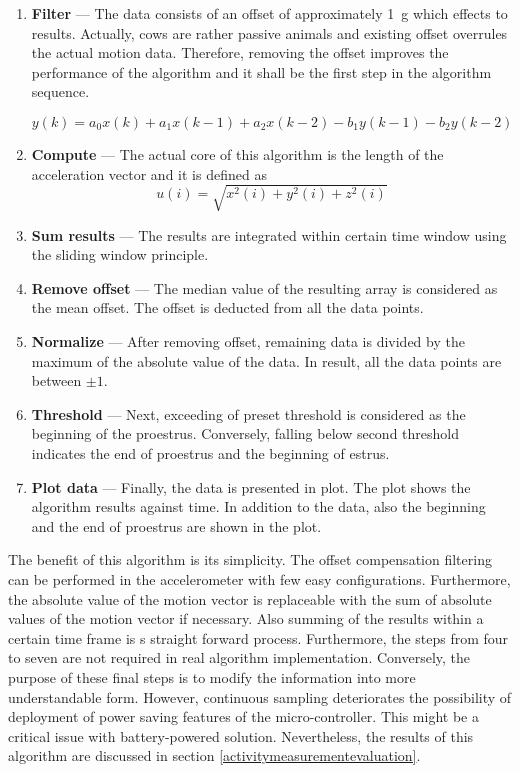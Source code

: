\documentclass[english,12pt,a4paper,pdftex,elec,utf8]{aaltothesis}
\begin{document}
\begin{enumerate}
\item \textbf{Filter} --- The data consists of an offset of approximately \SI{1}{\gram} which effects to results. Actually, cows are rather passive animals and existing offset overrules the actual motion data. Therefore, removing the offset improves the performance of the algorithm and it shall be the first step in the algorithm sequence.

\begin{equation}
y(k) = a_0 x(k) + a_1 x(k-1) + a_2 x(k-2) - b_1 y(k-1) - b_2 y(k-2)
\end{equation}

\item \textbf{Compute} --- The actual core of this algorithm is the length of the acceleration vector and it is defined as \begin{equation}
u(i) = \sqrt{x^2(i) + y^2(i) + z^2(i)} 
\end{equation}

\item \textbf{Sum results} --- The results are integrated within certain time window using the sliding window principle.

\item \textbf{Remove offset} --- The median value of the resulting array is considered as the mean offset. The offset is deducted from all the data points.

\item \textbf{Normalize} --- After removing offset, remaining data is divided by the maximum of the absolute value of the data. In result, all the data points are between $\pm 1$.

\item \textbf{Threshold} --- Next, exceeding of preset threshold is considered as the beginning of the proestrus. Conversely, falling below second threshold indicates the end of proestrus and the beginning of estrus.

\item \textbf{Plot data} --- Finally, the data is presented in plot. The plot shows the algorithm results against time. In addition to the data, also the beginning and the end of proestrus are shown in the plot.

\end{enumerate}
The benefit of this algorithm is its simplicity. The offset compensation filtering can be performed in the accelerometer with few easy configurations. Furthermore, the absolute value of the motion vector is replaceable with the sum of absolute values of the motion vector if necessary. Also summing of the results within a certain time frame is s straight forward process. Furthermore, the steps from four to seven are not required in real algorithm implementation. Conversely, the purpose of these final steps is to modify the information into more understandable form. However, continuous sampling deteriorates the possibility of deployment of power saving  features of the micro-controller. This might be a critical issue with battery-powered solution. Nevertheless, the results of this algorithm are discussed in section \ref{activitymeasurementevaluation}. 
\end{document}
